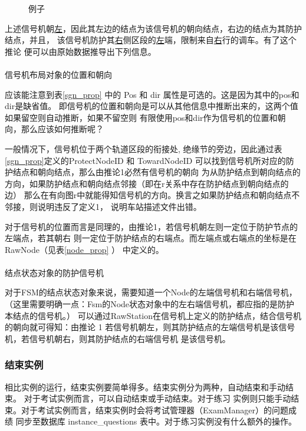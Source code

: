 \begin{figure}[htbp!]
    \centering
    
    \caption{\label{ens1}例子}
\end{figure}

上述信号机朝\uline{左}，因此其左边的结点为该信号机的朝向结点，右边的结点为其防护结点，并且，
该信号机防护其\uline{右}侧区段的\uline{左}端，限制来自\uline{右}行的调车。有了这个推论
便可以由原始数据推导出下列信息。

\paragraph{}信号机布局对象的位置和朝向

应该能注意到表\ref{sgn_prop} 中的 Pos 和 dir 属性是可选的。这是因为其中的pos和dir是缺省值。
即信号机的位置和朝向是可以从其他信息中推断出来的，这两个值如果留空则自动推断，如果不留空则
有限使用pos和dir作为信号机的位置和朝向，那么应该如何推断呢？

一般情况下，信号机位于两个轨道区段的衔接处, 绝缘节的旁边，因此通过表\ref{sgn_prop}定义的ProtectNodeID
和 TowardNodeID 可以找到信号机所对应的防护结点和朝向结点，那么由推论1必然有信号机的朝向
为从防护结点到朝向结点的方向，如果防护结点和朝向结点邻接（即在r关系中存在防护结点到朝向结点的边）
那么在有向图r中就能得知信号机的方向。换言之如果防护结点和朝向结点不邻接，则说明违反了定义1，
说明车站描述文件出错。

对于信号机的位置而言是同理的，由推论1，若信号机朝左则一定位于防护节点的左端点，若其朝右
则一定位于防护结点的右端点。而左端点或右端点的坐标是在RawNode（见表\ref{node_prop} ）
中定义的。

\paragraph{}结点状态对象的防护信号机

对于FSM的结点状态对象来说，需要知道一个Node的左端信号机和右端信号机，
（这里需要明确一点：Fsm的Node状态对象中的左右端信号机，都应指的是防护本结点的信号机。）
可以通过RawStation在信号机上定义的防护结点，结合信号机的朝向就可得知：由推论 1
若信号机朝左，则其防护结点的左端信号机是该信号机，若信号机朝右，则其防护结点的右端信号机
是该信号机。

\subsubsection{结束实例}
相比实例的运行，结束实例要简单得多。结束实例分为两种，自动结束和手动结束。
对于考试实例而言，可以自动结束或手动结束。对于练习
实例则只能手动结束。对于考试实例而言，结束实例时会将考试管理器（ExamManager）的问题成绩
同步至数据库 instance\_questions 表中。对于练习实例没有什么额外的操作。


